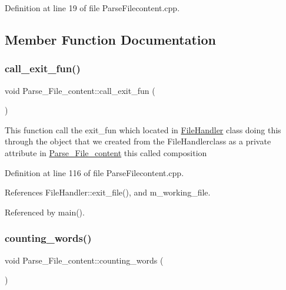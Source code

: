 Definition at line 19 of file Parse\+Filecontent.\+cpp.



\subsection{Member Function Documentation}
\mbox{\label{class_parse___file__content_a87e06838393e70610ae87439c22031ff}} 
\subsubsection{\texorpdfstring{call\+\_\+exit\+\_\+fun()}{call\_exit\_fun()}}
{\footnotesize\ttfamily void Parse\+\_\+\+File\+\_\+content\+::call\+\_\+exit\+\_\+fun (\begin{DoxyParamCaption}{ }\end{DoxyParamCaption})}

This function call the exit\+\_\+fun which located in \mbox{\hyperlink{class_file_handler}{File\+Handler}} class doing this through the object that we created from the File\+Handlerclass as a private attribute in \mbox{\hyperlink{class_parse___file__content}{Parse\+\_\+\+File\+\_\+content}} this called composition 

Definition at line 116 of file Parse\+Filecontent.\+cpp.



References File\+Handler\+::exit\+\_\+file(), and m\+\_\+working\+\_\+file.



Referenced by main().

\mbox{\label{class_parse___file__content_ae3ba604aada833588554be25c5c9a607}} 
\subsubsection{\texorpdfstring{counting\+\_\+words()}{counting\_words()}}
{\footnotesize\ttfamily void Parse\+\_\+\+File\+\_\+content\+::counting\+\_\+words (\begin{DoxyParamCaption}{ }\end{DoxyParamCaption})}

